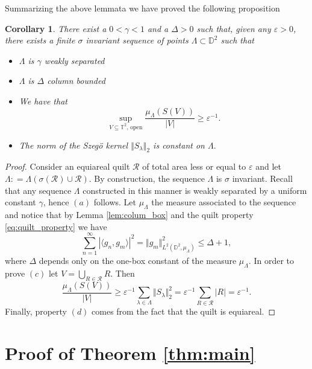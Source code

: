 \documentclass{amsart}
\numberwithin{equation}{section}
\newtheorem{coro}[thm]{Corollary}
\begin{document}
Summarizing the above lemmata we have proved the following proposition 
\begin{coro}
\label{coro_finite_pieces}
	There exist a $0<\gamma<1$ and a $\Delta>0$ such that, given any $\varepsilon >0$,
there exists a finite 
$\sigma $ invariant	sequence of points $\Lambda \subset \mathbb{D}^2 $ such that 
	\begin{itemize}
		\item[(a)] $\Lambda $ is $\gamma $ weakly separated
		\item[(b)] $\Lambda $ is $\Delta $ column bounded
			
		\item[(c)] We have that 
			\[ \sup_{V \subseteq \mathbb{T}^2, \, \text{open}} \frac{\mu_\Lambda(S(V))}{|V|} \geq \varepsilon^{-1}. \]
			
		\item[(d)] The norm of the Szeg\"o kernel $ \Vert S_\lambda\Vert_2 $ is constant on $\Lambda. $ 
	\end{itemize}
\end{coro}

\begin{proof}
	Consider an equiareal quilt $\mathcal{R} $ of total area less or equal to $ \varepsilon $ and let $ \Lambda : = \Lambda(\sigma(\mathcal{R})\cup \mathcal{R}). $ By construction, the  sequence $\Lambda  $ is $\sigma $ invariant.  Recall that any  sequence $\Lambda $ constructed in this manner is weakly separated by a uniform constant $\gamma $, hence $(a) $ 
	follows.
	Let $\mu_\Lambda $ the measure associated to the sequence and notice that by Lemma \ref{lem:colum_box} and the quilt property \eqref{eq:quilt_property} we have 
	\[ \sum_{n=1}^\infty|\langle g_n, g_m \rangle|^2 = \Vert g_m\Vert^2_{L^2(\mathbb{D}^2,\mu_\Lambda)} \leq \Delta + 1, \]
	where $\Delta $ depends only on the one-box constant of the measure $\mu_\Lambda$.
	In order to prove $(c) $ let $V = \bigcup_{R\in \mathcal{R}}R $. Then 
	\[ \frac{\mu_\Lambda(S(V))}{|V|} \geq \varepsilon^{-1} \sum_{\lambda\in\Lambda} \Vert S_\lambda \Vert^2_2 = \varepsilon^{-1}\sum_{R\in \mathcal{R}}|R| = \varepsilon^{-1}. \]
  Finally, property $(d) $ comes from the fact that the quilt is equiareal.  	
\end{proof}

 


\section{Proof of Theorem \ref{thm:main}}
\label{sec:proof}
\end{document}
